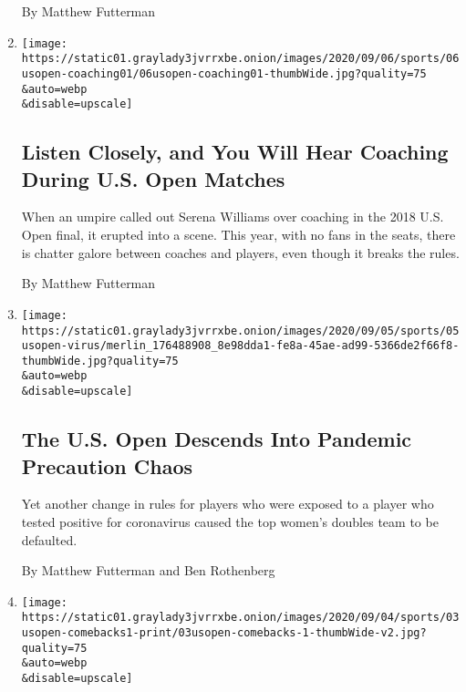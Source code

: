 \begin{enumerate}
  By Matthew Futterman
\item
  \href{/2020/09/06/sports/tennis/us-open-coaching.html}{}

  \texttt{[image: https://static01.graylady3jvrrxbe.onion/images/2020/09/06/sports/06usopen-coaching01/06usopen-coaching01-thumbWide.jpg?quality=75\\\&auto=webp\\\&disable=upscale]}

  \hypertarget{listen-closely-and-you-will-hear-coaching-during-us-open-matches}{%
  \subsection{Listen Closely, and You Will Hear Coaching During U.S.
  Open
  Matches}\label{listen-closely-and-you-will-hear-coaching-during-us-open-matches}}

  When an umpire called out Serena Williams over coaching in the 2018
  U.S. Open final, it erupted into a scene. This year, with no fans in
  the seats, there is chatter galore between coaches and players, even
  though it breaks the rules.

  By Matthew Futterman
\item
  \href{/2020/09/05/sports/the-us-open-virus-quarantine-chaos.html}{}

  \texttt{[image: https://static01.graylady3jvrrxbe.onion/images/2020/09/05/sports/05usopen-virus/merlin\_176488908\_8e98dda1-fe8a-45ae-ad99-5366de2f66f8-thumbWide.jpg?quality=75\\\&auto=webp\\\&disable=upscale]}

  \hypertarget{the-us-open-descends-into-pandemic-precaution-chaos}{%
  \subsection{The U.S. Open Descends Into Pandemic Precaution
  Chaos}\label{the-us-open-descends-into-pandemic-precaution-chaos}}

  Yet another change in rules for players who were exposed to a player
  who tested positive for coronavirus caused the top women's doubles
  team to be defaulted.

  By Matthew Futterman and Ben Rothenberg
\item
  \href{/2020/09/03/sports/tennis/andy-murray-kim-clijsters-us-open.html}{}

  \texttt{[image: https://static01.graylady3jvrrxbe.onion/images/2020/09/04/sports/03usopen-comebacks1-print/03usopen-comebacks-1-thumbWide-v2.jpg?quality=75\\\&auto=webp\\\&disable=upscale]}

  \hypertarget{andy-murray-and-kim-clijsters-picked-a-brutal-year-for-a-comeback}{%
}
\end{enumerate}
